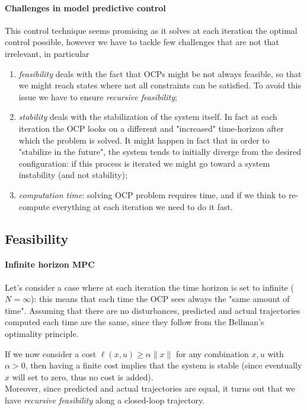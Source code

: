 	\paragraph{Challenges in model predictive control} This control technique seems promising as it solves at each iteration the optimal control possible, however we have to tackle few challenges that are not that irrelevant, in particular
	\begin{enumerate}[\itshape i)]
		\item \textit{feasibility} deals with the fact that OCPs might be not always feasible, so that we might reach states where not all constraints can be satisfied. To avoid this issue we have to ensure \textit{recursive feasibility};
		\item \textit{stability} deals with the stabilization of the system itself. In fact at each iteration the OCP looks on a different and "increased" time-horizon after which the problem is solved. It might happen in fact that in order to "stabilize in the future", the system tends to initially diverge from the desired configuration: if this process is iterated we might go toward a system instability (and not stability);
		\item \textit{computation time}: solving OCP problem requires time, and if we think to re-compute everything at each iteration we need to do it fast.
	\end{enumerate}
	
\subsection{Feasibility}
	\paragraph{Infinite horizon MPC} Let's consider a case where at each iteration the time horizon is set to infinite ($N=\infty$): this means that each time the OCP sees always the "same amount of time". Assuming that there are no disturbances, predicted and actual trajectories computed each time are the same, since they follow from the Bellman's optimality principle.
	
	If we now consider a cost $\ell(x,u) \geq \alpha \|x\|$ for any combination $x,u$ with $\alpha > 0$, then having a finite cost implies that the system is stable (since eventually $x$ will set to zero, thus no cost is added).\\
	Moreover, since predicted and actual trajectories are equal, it turns out that we have \textit{recursive feasibility} along a closed-loop trajectory.
	
